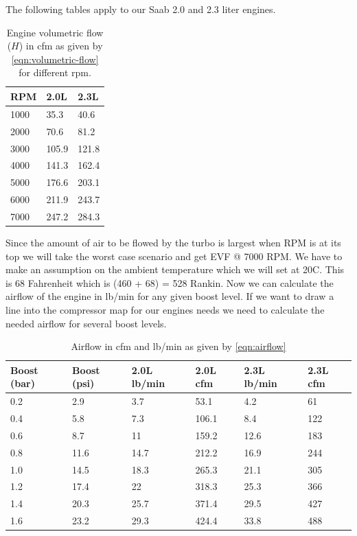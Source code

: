 \documentclass[11pt,a4paper]{book}
\begin{document}
The following tables apply to our Saab 2.0 and 2.3 liter engines.
\begin{table}
    \centering
    \begin{tabular}{lll}
    RPM & 2.0L & 2.3L \\
    \midrule
1000 & 35.3 &40.6 \\
2000 & 70.6 &81.2  \\
3000 & 105.9 &121.8 \\
4000 & 141.3 &162.4 \\
5000 & 176.6 &203.1 \\
6000 & 211.9 &243.7 \\
7000 & 247.2 &284.3
    \end{tabular}
    \caption{Engine volumetric flow ($H$) in cfm as given by \cref{eqn:volumetric-flow}
    for different rpm.}
    \label{tab:volumetric-flow-rpm}
\end{table}
Since the amount of air to be flowed by the turbo is largest when RPM is at its
top we will take the worst case scenario and get EVF @ 7000 RPM. We have to make
an assumption on the ambient temperature which we will set at 20C. This is 68
Fahrenheit which is (460 + 68) = 528 Rankin. Now we can calculate the airflow of
the engine in lb/min for any given boost level. If we want to draw a line into
the compressor map for our engines needs we need to calculate the needed airflow
for several boost levels.

\begin{table}
    \centering
    \begin{tabular}{llllll}
        Boost (bar) & Boost (psi) & 2.0L lb/min & 2.0L cfm & 2.3L lb/min & 2.3L
        cfm \\
        \midrule
0.2 & 2.9 &3.7& 53.1& 4.2& 61 \\
0.4 & 5.8 &7.3 &106.1& 8.4& 122 \\
0.6 & 8.7 &11& 159.2 &12.6 &183 \\
0.8 & 11.6& 14.7& 212.2 &16.9 &244 \\
1.0 & 14.5& 18.3& 265.3 &21.1 &305 \\
1.2 & 17.4& 22& 318.3 &25.3 &366 \\
1.4 & 20.3& 25.7 &371.4 &29.5 &427 \\
1.6 & 23.2& 29.3 &424.4 &33.8 & 488
    \end{tabular}
    \caption{Airflow in cfm and lb/min as given by \cref{eqn:airflow}}
    \label{tab:airflow-rpm}
\end{table}
\end{document}
